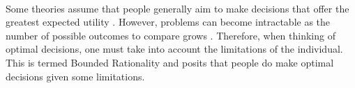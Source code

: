 \documentclass[12pt]{article}
\begin{document}
\paragraph{} Some theories assume that people generally aim to make decisions that offer the greatest expected utility \citep{mongin1997expected}. However, problems can become intractable as the number of possible outcomes to compare grows \citep[see ][ for a discussion of this]{BOSSAERTS2017917}. Therefore, when thinking of optimal decisions, one must take into account the limitations of the individual. This is termed Bounded Rationality \citep{simon1990invariants} and posits that people do make optimal decisions given some limitations.  


\end{document}
